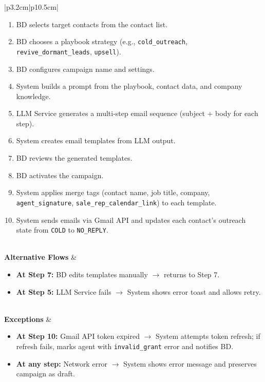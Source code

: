 \documentclass[a4paper]{article}
\begin{document}
\begin{table}[H]
\begin{tabular}{|p{3.2cm}|p{10.5cm}|}
\begin{minipage}[t]{\linewidth}
\begin{enumerate}[nosep,leftmargin=*]
  \item BD selects target contacts from the contact list.
  \item BD chooses a playbook strategy (e.g., 
  \texttt{cold\_outreach}, \texttt{revive\_dormant\_leads}, 
  \texttt{upsell}).
  \item BD configures campaign name and settings.
  \item System builds a prompt from the playbook, contact data, 
  and company knowledge.
  \item LLM Service generates a multi-step email sequence 
  (subject + body for each step).
  \item System creates email templates from LLM output.
  \item BD reviews the generated templates.
  \item BD activates the campaign.
  \item System applies merge tags (contact name, job title, 
  company, \texttt{agent\_signature}, 
  \texttt{sale\_rep\_calendar\_link}) to each template.
  \item System sends emails via Gmail API and updates each 
  contact's outreach state from \texttt{COLD} to 
  \texttt{NO\_REPLY}.
\end{enumerate}
\end{minipage} \\
\hline
\textbf{Alternative Flows} &
\begin{minipage}[t]{\linewidth}
\begin{itemize}[nosep,leftmargin=*]
  \item \textbf{At Step 7:} BD edits templates manually 
  $\rightarrow$ returns to Step 7.
  \item \textbf{At Step 5:} LLM Service fails $\rightarrow$ 
  System shows error toast and allows retry.
\end{itemize}
\end{minipage} \\
\hline
\textbf{Exceptions} &
\begin{minipage}[t]{\linewidth}
\begin{itemize}[nosep,leftmargin=*]
  \item \textbf{At Step 10:} Gmail API token expired $\rightarrow$ 
  System attempts token refresh; if refresh fails, marks agent 
  with \texttt{invalid\_grant} error and notifies BD.
  \item \textbf{At any step:} Network error $\rightarrow$ System 
  shows error message and preserves campaign as draft.
\end{itemize}
\end{minipage} \\
\hline
\end{tabular}
\end{table}
\end{document}
